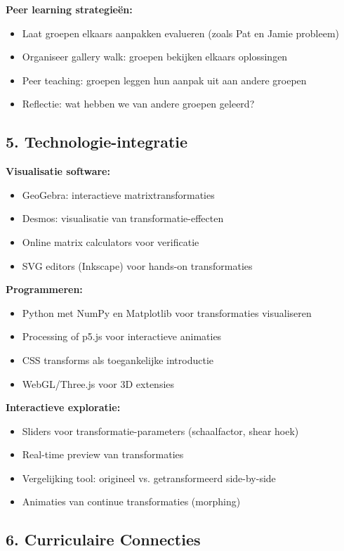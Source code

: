 \documentclass{ximera}
\begin{document}
\textbf{Peer learning strategieën:}
\begin{itemize}
\item Laat groepen elkaars aanpakken evalueren (zoals Pat en Jamie probleem)
\item Organiseer gallery walk: groepen bekijken elkaars oplossingen
\item Peer teaching: groepen leggen hun aanpak uit aan andere groepen
\item Reflectie: wat hebben we van andere groepen geleerd?
\end{itemize}

\subsection*{5. Technologie-integratie}

\textbf{Visualisatie software:}
\begin{itemize}
\item GeoGebra: interactieve matrixtransformaties
\item Desmos: visualisatie van transformatie-effecten
\item Online matrix calculators voor verificatie
\item SVG editors (Inkscape) voor hands-on transformaties
\end{itemize}

\textbf{Programmeren:}
\begin{itemize}
\item Python met NumPy en Matplotlib voor transformaties visualiseren
\item Processing of p5.js voor interactieve animaties
\item CSS transforms als toegankelijke introductie
\item WebGL/Three.js voor 3D extensies
\end{itemize}

\textbf{Interactieve exploratie:}
\begin{itemize}
\item Sliders voor transformatie-parameters (schaalfactor, shear hoek)
\item Real-time preview van transformaties
\item Vergelijking tool: origineel vs. getransformeerd side-by-side
\item Animaties van continue transformaties (morphing)
\end{itemize}

\subsection*{6. Curriculaire Connecties}
\end{document}
